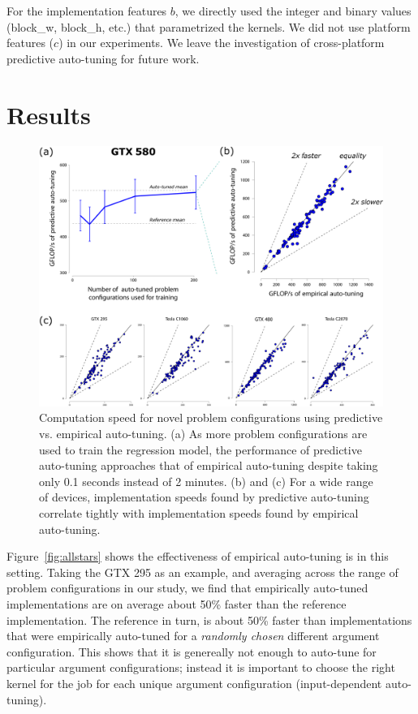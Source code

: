 \documentclass{sig-alternate}
\begin{document}
For the implementation features $b$, we directly used the integer and binary
values (block\_w, block\_h, etc.) that parametrized the kernels.  We did not
use platform features ($c$) in our experiments. We leave the investigation of
cross-platform predictive auto-tuning for future work.

\section{Results}

\begin{figure}[!t]
\centering
\includegraphics[width=.9\linewidth]{illustrator/fig_main_R1.pdf}
\caption{
Computation speed for novel problem configurations using predictive
vs. empirical auto-tuning.
(a) As more problem configurations are used to train the regression model,
the performance of predictive auto-tuning approaches that of empirical auto-tuning
despite taking only 0.1 seconds instead of 2 minutes.
(b) and (c) For a wide range of devices, implementation speeds found by predictive auto-tuning correlate tightly with
implementation speeds found by empirical auto-tuning.
}
\label{fig:fig_gflop_scatter}
\end{figure}


Figure~\ref{fig:allstars} shows the effectiveness of empirical auto-tuning is
in this setting.  Taking the GTX 295 as an example, and averaging across the
range of problem configurations in our study, we find that empirically
auto-tuned implementations are on average about 50\% faster than the reference
implementation.  The reference in turn, is about 50\% faster than
implementations that were empirically auto-tuned for a \emph{randomly chosen}
different argument configuration.  This shows that it is genereally not enough
to auto-tune for particular argument configurations; instead it is important to
choose the right kernel for the job for each unique argument configuration
(input-dependent auto-tuning).
\end{document}
